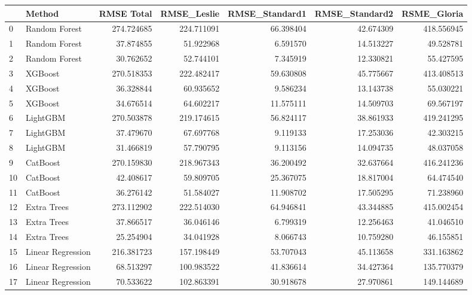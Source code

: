 \begin{tabular}{llrrrrr}
\toprule
{} &             Method &  RMSE Total &  RMSE\_Leslie &  RMSE\_Standard1 &  RMSE\_Standard2 &  RSME\_Gloria \\
\midrule
0  &      Random Forest &  274.724685 &   224.711091 &       66.398404 &       42.674309 &   418.556945 \\
1  &      Random Forest &   37.874855 &    51.922968 &        6.591570 &       14.513227 &    49.528781 \\
2  &      Random Forest &   30.762652 &    52.744101 &        7.345919 &       12.330821 &    55.427595 \\
3  &            XGBoost &  270.518353 &   222.482417 &       59.630808 &       45.775667 &   413.408513 \\
4  &            XGBoost &   36.328844 &    60.935652 &        9.586234 &       13.143738 &    55.030221 \\
5  &            XGBoost &   34.676514 &    64.602217 &       11.575111 &       14.509703 &    69.567197 \\
6  &           LightGBM &  270.503878 &   219.174615 &       56.824117 &       38.861933 &   419.241295 \\
7  &           LightGBM &   37.479670 &    67.697768 &        9.119133 &       17.253036 &    42.303215 \\
8  &           LightGBM &   31.466819 &    57.790795 &        9.113156 &       14.094735 &    48.037058 \\
9  &           CatBoost &  270.159830 &   218.967343 &       36.200492 &       32.637664 &   416.241236 \\
10 &           CatBoost &   42.408617 &    59.809705 &       25.367075 &       18.817004 &    64.474540 \\
11 &           CatBoost &   36.276142 &    51.584027 &       11.908702 &       17.505295 &    71.238960 \\
12 &        Extra Trees &  273.112902 &   222.514030 &       64.946841 &       43.344885 &   415.002454 \\
13 &        Extra Trees &   37.866517 &    36.046146 &        6.799319 &       12.256463 &    41.046510 \\
14 &        Extra Trees &   25.254904 &    34.041928 &        8.066743 &       10.759280 &    46.155851 \\
15 &  Linear Regression &  216.381723 &   157.198449 &       53.707043 &       45.113658 &   331.163862 \\
16 &  Linear Regression &   68.513297 &   100.983522 &       41.836614 &       34.427364 &   135.770379 \\
17 &  Linear Regression &   70.533622 &   102.863391 &       30.918678 &       27.970861 &   149.144689 \\
\bottomrule
\end{tabular}
